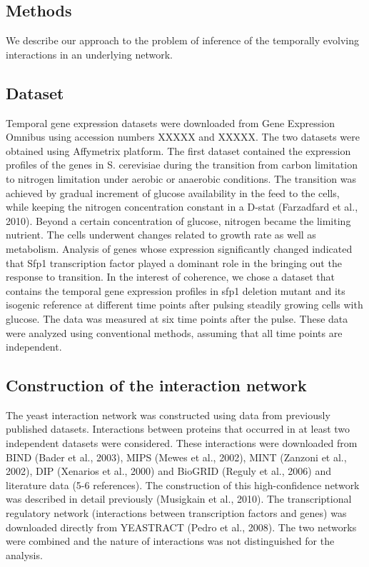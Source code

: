 \documentclass{bioinfo}
\begin{document}
\begin{methods}
\section{Methods}
We describe our approach to the problem of inference of the temporally
evolving interactions in an underlying network.
\subsection{Dataset}
 Temporal gene expression datasets were downloaded from Gene
 Expression Omnibus using accession numbers XXXXX and XXXXX. The two
 datasets were obtained using Affymetrix platform. The first dataset
 contained the expression profiles of the genes in S. cerevisiae
 during the transition from carbon limitation to nitrogen limitation
 under aerobic or anaerobic conditions. The transition was achieved by
 gradual increment of glucose availability in the feed to the cells,
 while keeping the nitrogen concentration constant in a D-stat
 (Farzadfard et al., 2010). Beyond a certain concentration of glucose,
 nitrogen became the limiting nutrient. The cells underwent changes
 related to growth rate as well as metabolism. Analysis of genes whose
 expression significantly changed indicated that Sfp1 transcription
 factor played a dominant role in the bringing out the response to
 transition. In the interest of coherence, we chose a dataset that
 contains the temporal gene expression profiles in sfp1 deletion
 mutant and its isogenic reference at different time points after
 pulsing steadily growing cells with glucose. The data was measured at
 six time points after the pulse. These data were analyzed using
 conventional methods, assuming that all time points are independent.
\subsection{Construction of the interaction network}

The yeast interaction network was constructed using data from previously published datasets. Interactions between proteins that occurred in at least two independent datasets were considered. These interactions were downloaded from BIND (Bader et al., 2003), MIPS (Mewes et al., 2002), MINT (Zanzoni et al., 2002), DIP (Xenarios et al., 2000) and BioGRID (Reguly et al., 2006) and literature data (5-6 references). The construction of this high-confidence network was described in detail previously (Musigkain et al., 2010). The transcriptional regulatory network (interactions between transcription factors and genes) was downloaded directly from YEASTRACT (Pedro et al., 2008). The two networks were combined and the nature of interactions was not distinguished for the analysis.


\end{methods}
\end{document}
